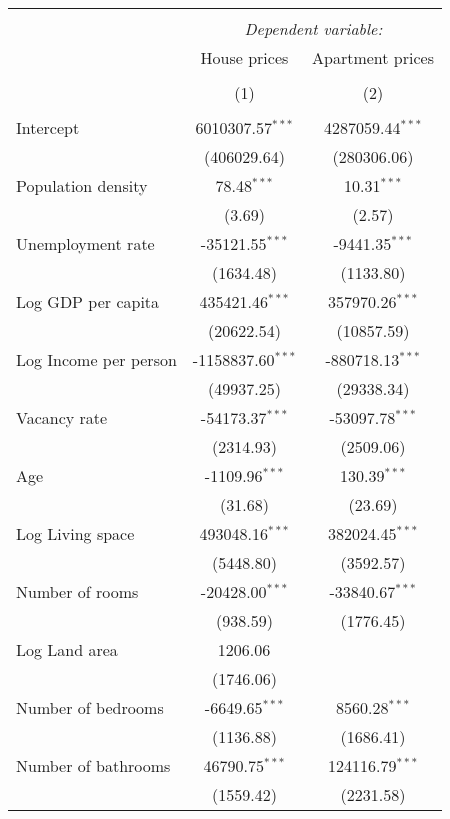 \begin{table}[!htbp] \centering
\begin{tabular}{@{\extracolsep{5pt}}lcc}
\\[-1.8ex]\hline
\hline \\[-1.8ex]
& \multicolumn{2}{c}{\textit{Dependent variable:}} \
\cr \cline{2-3}
\\[-1.8ex] & \multicolumn{1}{c}{House prices} & \multicolumn{1}{c}{Apartment prices}  \\
\\[-1.8ex] & (1) & (2) \\
\hline \\[-1.8ex]
 Intercept & 6010307.57$^{***}$ & 4287059.44$^{***}$ \\
  & (406029.64) & (280306.06) \\
 Population density & 78.48$^{***}$ & 10.31$^{***}$ \\
  & (3.69) & (2.57) \\
 Unemployment rate & -35121.55$^{***}$ & -9441.35$^{***}$ \\
  & (1634.48) & (1133.80) \\
 Log GDP per capita & 435421.46$^{***}$ & 357970.26$^{***}$ \\
  & (20622.54) & (10857.59) \\
 Log Income per person & -1158837.60$^{***}$ & -880718.13$^{***}$ \\
  & (49937.25) & (29338.34) \\
 Vacancy rate & -54173.37$^{***}$ & -53097.78$^{***}$ \\
  & (2314.93) & (2509.06) \\
 Age & -1109.96$^{***}$ & 130.39$^{***}$ \\
  & (31.68) & (23.69) \\
 Log Living space & 493048.16$^{***}$ & 382024.45$^{***}$ \\
  & (5448.80) & (3592.57) \\
 Number of rooms & -20428.00$^{***}$ & -33840.67$^{***}$ \\
  & (938.59) & (1776.45) \\
 Log Land area & 1206.06$^{}$ & \\
  & (1746.06) & \\
 Number of bedrooms & -6649.65$^{***}$ & 8560.28$^{***}$ \\
  & (1136.88) & (1686.41) \\
 Number of bathrooms & 46790.75$^{***}$ & 124116.79$^{***}$ \\
  & (1559.42) & (2231.58) \\

\end{tabular}
\end{table}
